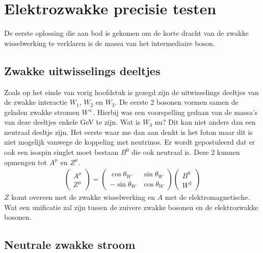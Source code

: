 \documentclass[../main.tex]{subfiles}
\begin{document}
\section{Elektrozwakke precisie testen}%
\label{sec:elektrozwakke_precisie_testen}

De eerste oplossing die aan bod is gekomen om de korte dracht van de zwakke wisselwerking te verklaren is de massa van het intermediaire boson.

\subsection{Zwakke uitwisselings deeltjes}%
\label{sub:zwakke_uitwisselings_deeltjes}

Zoals op het einde van vorig hoofdstuk is gezegd zijn de uitwisselings deeltjes van de zwakke interactie $W_1$, $W_2$ en $W_3$. De eerste 2 bosonen vormen samen de geladen zwakke stromen $W^\pm$. Hierbij was een voorspelling gedaan van de massa's van deze deeltjes enkele GeV te zijn. Wat is $W_3$ nu? Dit kan niet anders dan een neutraal deeltje zijn. Het eerste waar me dan aan denkt is het foton maar dit is niet mogelijk vanwege de koppeling met neutrinos. Er wordt gepostuleerd dat er ook een isospin singlet moet bestaan $B^0$ die ook neutraal is. Deze 2 kunnen opmengen tot $A^\mu$ en $Z^\mu$.
\begin{equation}
    \begin{aligned}
        \label{eq:zwakke_boson_opmenging}
        \begin{pmatrix}
            A^\mu\\
            Z^\mu
        \end{pmatrix}
        =
        \begin{pmatrix}
            \cos\theta_W & \sin\theta_W\\
            -\sin\theta_W & \cos\theta_W
        \end{pmatrix}
        \begin{pmatrix}
            B^0\\
            W^3
        \end{pmatrix}
    \end{aligned}
\end{equation}
$Z$ komt overeen met de zwakke wisselwerking en $A$ met de elektromagnetische. Wat een unificatie zal zijn tussen de zuivere zwakke bosonen en de elektrozwakke bosonen.

\subsection{Neutrale zwakke stroom}%
\label{sub:neutrale_zwakke_stroom}
\end{document}
